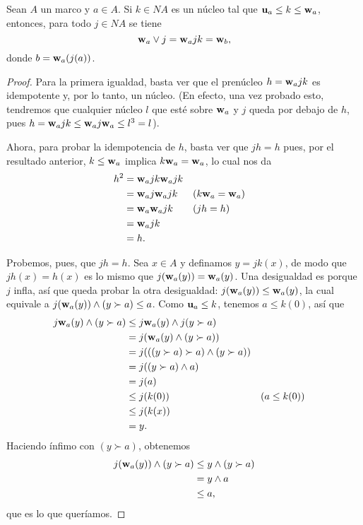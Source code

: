 \begin{thm}
    Sean $A$ un marco y $a\in A$.
    Si $k\in NA$ es un núcleo tal que $\mathbf u_{a}\leq k\leq\mathbf w_{a}$,
    entonces, para todo $j\in NA$ se tiene
    \[
        \mathbf w_{a}\vee j = \mathbf w_{a} j k = \mathbf w_{b}
    ,\]
    donde $b=\mathbf w_{a}(j(a))$.
\end{thm}
\begin{proof}
    Para la primera igualdad,
    basta ver que el prenúcleo $h=\mathbf w_{a}jk$ es idempotente
    y, por lo tanto, un núcleo.
    (En efecto, una vez probado esto, tendremos que
    cualquier núcleo $l$ que esté sobre $\mathbf w_{a}$ y $j$ queda
    por debajo de $h$, pues
    $h=\mathbf w_{a}jk\leq\mathbf w_{a}j\mathbf w_{a}\leq l^3=l$).
    
    Ahora, para probar la idempotencia de $h$,
    basta ver que $jh=h$ pues,
    por el resultado anterior,
    $k\leq\mathbf w_{a}$ implica $k\mathbf w_{a}=\mathbf w_{a}$,
    lo cual nos da
    \begin{align*}
        h^2
        &= \mathbf w_{a}jk\mathbf w_{a}jk \\ 
        &= \mathbf w_{a}j\mathbf w_{a}jk
            && (k\mathbf w_{a}=\mathbf w_{a}) \\ 
        &= \mathbf w_{a}\mathbf w_{a}jk
            && (jh=h)\\ 
        &= \mathbf w_{a}jk \\ 
        &= h.
    \end{align*}
    
    Probemos, pues, que $jh=h$.
    Sea $x\in A$ y definamos $y=jk(x)$,
    de modo que $jh(x)=h(x)$ es lo mismo que
    $j(\mathbf w_{a}(y))=\mathbf w_{a}(y)$.
    Una desigualdad es porque $j$ infla,
    así que queda probar la otra desigualdad:
    $j(\mathbf w_{a}(y))\leq\mathbf w_{a}(y)$,
    la cual equivale a $j(\mathbf w_{a}(y))\wedge(y\succ a)\leq a$.
    Como $\mathbf u_{a}\leq k$, tenemos $a\leq k(0)$, así que
    \begin{align*}
        j\mathbf w_{a}(y)\wedge(y\succ a)
        &\leq j\mathbf w_{a}(y)\wedge j(y\succ a) \\
        &= j(\mathbf w_{a}(y)\wedge (y\succ a)) \\
        &= j(((y\succ a)\succ a)\wedge (y\succ a)) \\
        &= j((y\succ a)\wedge a) \\
        &= j(a) \\
        &\leq j(k(0)) && (a\leq k(0)) \\
        &\leq j(k(x)) \\
        &= y.
    \end{align*}
    Haciendo ínfimo con $(y\succ a)$, obtenemos
    \begin{align*}
        j(\mathbf w_{a}(y))\wedge (y\succ a)
        &\leq y\wedge (y\succ a) \\
        &= y\wedge a \\
        &\leq a,
    \end{align*}
    que es lo que queríamos.
    

\end{proof}
